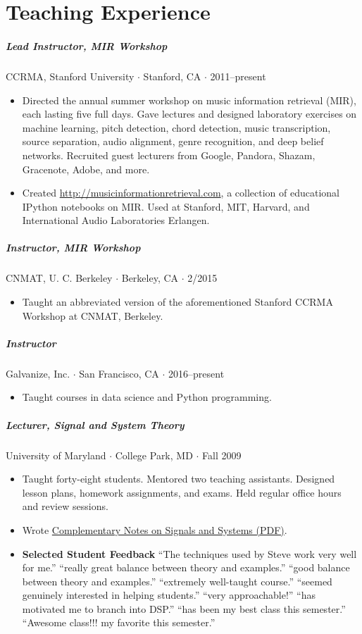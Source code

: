 \documentclass[10pt,letterpaper]{article}
\begin{document}
\section*{Teaching Experience}

\subparagraph{Lead Instructor, MIR Workshop} CCRMA, Stanford University $\cdot$ Stanford, CA $\cdot$ 2011--present
\begin{itemize}
    \item Directed the annual summer workshop on music information retrieval (MIR), each lasting five full days.  Gave lectures and designed laboratory exercises on machine learning, pitch detection, chord detection, music transcription, source separation, audio alignment, genre recognition, and deep belief networks. Recruited guest lecturers from Google, Pandora, Shazam, Gracenote, Adobe, and more.
    \item Created \url{http://musicinformationretrieval.com}, a collection of educational IPython notebooks on MIR. Used at Stanford, MIT, Harvard, and International Audio Laboratories Erlangen.
\end{itemize}

\subparagraph{Instructor, MIR Workshop} CNMAT, U. C. Berkeley $\cdot$ Berkeley, CA $\cdot$ 2/2015
\begin{itemize}
    \item Taught an abbreviated version of the aforementioned Stanford CCRMA Workshop at CNMAT, Berkeley.
\end{itemize}

\subparagraph{Instructor} Galvanize, Inc. $\cdot$ San Francisco, CA $\cdot$ 2016--present
\begin{itemize}
    \item Taught courses in data science and Python programming.
\end{itemize}

\subparagraph{Lecturer, Signal and System Theory} University of Maryland $\cdot$ College Park, MD $\cdot$ Fall 2009
\begin{itemize}
    \item Taught forty-eight students. Mentored two teaching assistants. Designed lesson plans, homework assignments, and exams. Held regular office hours and review sessions.
    \item Wrote \href{https://stevetjoa.com/static/notes322_20091119.pdf}{Complementary Notes on Signals and Systems (PDF)}.
    \item \textbf{Selected Student Feedback}  ``The techniques used by Steve work very well for me.'' ``really great balance between theory and examples.'' ``good balance between theory and examples.'' ``extremely well-taught course.'' ``seemed genuinely interested in helping students.'' ``very approachable!'' ``has motivated me to branch into DSP.'' ``has been my best class this semester.'' ``Awesome class!!! my favorite this semester.''
\end{itemize}
\end{document}

